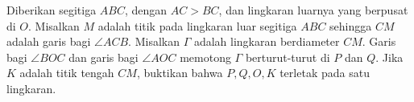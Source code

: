 Diberikan segitiga $ABC$, dengan $AC > BC$, dan lingkaran luarnya yang berpusat di $O$. Misalkan $M$ adalah titik pada lingkaran luar segitiga $ABC$ sehingga $CM$ adalah garis bagi $\angle ACB$. Misalkan $\Gamma$ adalah lingkaran berdiameter $CM$. Garis bagi $\angle BOC$ dan garis bagi $\angle AOC$ memotong $\Gamma$ berturut-turut di $P$ dan $Q$. Jika $K$ adalah titik tengah $CM$, buktikan bahwa $P, Q, O, K$ terletak pada satu lingkaran.